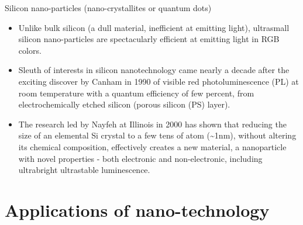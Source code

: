 \documentclass[11pt,dvipsnames,ignorenonframetext,aspectratio=169]{beamer}
\providecommand{\tightlist}{%
  \setlength{\itemsep}{0pt}\setlength{\parskip}{0pt}}
\begin{document}
\begin{frame}{Silicon nano-particles (nano-crystallites or quantum
dots)}
\protect\hypertarget{silicon-nano-particles-nano-crystallites-or-quantum-dots}{}
\begin{itemize}
\tightlist
\item
  Unlike bulk silicon (a dull material, inefficient at emitting light),
  ultrasmall silicon nano-particles are spectacularly efficient at
  emitting light in RGB colors.
\item
  Sleuth of interests in silicon nanotechnology came nearly a decade
  after the exciting discover by Canham in 1990 of visible red
  photoluminescence (PL) at room temperature with a quantum efficiency
  of few percent, from electrochemically etched silicon (porous silicon
  (PS) layer).
\item
  The research led by Nayfeh at Illinois in 2000 has shown that reducing
  the size of an elemental Si crystal to a few tens of atom
  (\textasciitilde1nm), without altering its chemical composition,
  effectively creates a new material, a nanoparticle with novel
  properties - both electronic and non-electronic, including ultrabright
  ultrastable luminescence.
\end{itemize}
\end{frame}

\hypertarget{applications-of-nano-technology}{%
\section{Applications of
nano-technology}\label{applications-of-nano-technology}}
\end{document}

